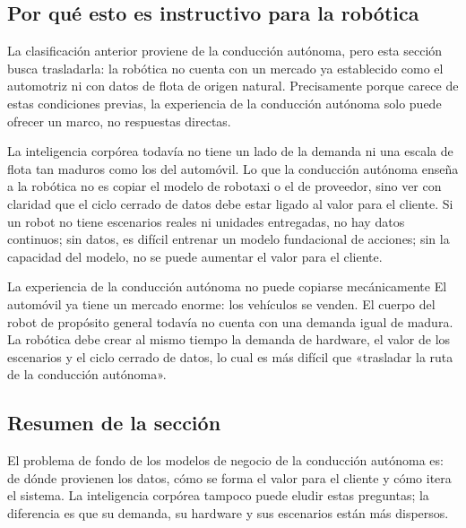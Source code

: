 \subsection{Por qué esto es instructivo para la robótica}

La clasificación anterior proviene de la conducción autónoma, pero esta sección busca trasladarla: la robótica no cuenta con un mercado ya establecido como el automotriz ni con datos de flota de origen natural. Precisamente porque carece de estas condiciones previas, la experiencia de la conducción autónoma solo puede ofrecer un marco, no respuestas directas.

La inteligencia corpórea todavía no tiene un lado de la demanda ni una escala de flota tan maduros como los del automóvil. Lo que la conducción autónoma enseña a la robótica no es copiar el modelo de robotaxi o el de proveedor, sino ver con claridad que el ciclo cerrado de datos debe estar ligado al valor para el cliente. Si un robot no tiene escenarios reales ni unidades entregadas, no hay datos continuos; sin datos, es difícil entrenar un modelo fundacional de acciones; sin la capacidad del modelo, no se puede aumentar el valor para el cliente.

\begin{warningbox}{La experiencia de la conducción autónoma no puede copiarse mecánicamente}
El automóvil ya tiene un mercado enorme: los vehículos se venden. El cuerpo del robot de propósito general todavía no cuenta con una demanda igual de madura. La robótica debe crear al mismo tiempo la demanda de hardware, el valor de los escenarios y el ciclo cerrado de datos, lo cual es más difícil que «trasladar la ruta de la conducción autónoma».
\end{warningbox}

\subsection{Resumen de la sección}

El problema de fondo de los modelos de negocio de la conducción autónoma es: de dónde provienen los datos, cómo se forma el valor para el cliente y cómo itera el sistema. La inteligencia corpórea tampoco puede eludir estas preguntas; la diferencia es que su demanda, su hardware y sus escenarios están más dispersos.
